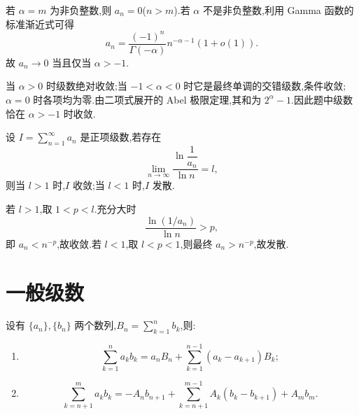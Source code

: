 \begin{solution}
    若 $\alpha=m$ 为非负整数,则 $a_n=0$($n>m$).若 $\alpha$ 不是非负整数,利用 Gamma 函数的标准渐近式可得
    \[
        a_n=\dfrac{(-1)^n}{\Gamma(-\alpha)}n^{-\alpha-1}(1+o(1)).
    \]
    故 $a_n\to0$ 当且仅当 $\alpha>-1$.

    当 $\alpha>0$ 时级数绝对收敛;当 $-1<\alpha<0$ 时它是最终单调的交错级数,条件收敛;$\alpha=0$ 时各项均为零.由二项式展开的 Abel 极限定理,其和为 $2^\alpha-1$.因此题中级数恰在 $\alpha>-1$ 时收敛.
\end{solution}

\begin{example}[对数判别法]
    设 $\displaystyle I=\sum\limits_{n=1}^{\infty}a_n$ 是正项级数,若存在
    \[
        \displaystyle\lim\limits_{n\to\infty}\dfrac{\ln\dfrac{1}{a_n}}{\ln n}=l,
    \]
    则当 $l>1$ 时,$I$ 收敛;当 $l<1$ 时,$I$ 发散.
\end{example}
\exampleblank

\begin{solution}
    若 $l>1$,取 $1<p<l$.充分大时
    \[
        \dfrac{\ln(1/a_n)}{\ln n}>p,
    \]
    即 $a_n<n^{-p}$,故收敛.若 $l<1$,取 $l<p<1$,则最终
    $a_n>n^{-p}$,故发散.
\end{solution}


\newpage

\section{一般级数}

\begin{proposition}
    设有 $\{a_n\},\{b_n\}$ 两个数列,$\displaystyle B_n=\sum\limits_{k=1}^nb_k$,则:
    \begin{enumerate}
        \item
              \[
                  \displaystyle\sum\limits_{k=1}^na_kb_k
                  =a_nB_n+\sum\limits_{k=1}^{n-1}(a_k-a_{k+1})B_k;
              \]
        \item
              \[
                  \displaystyle\sum\limits_{k=n+1}^ma_kb_k
                  =-A_nb_{n+1}+\sum\limits_{k=n+1}^{m-1}A_k(b_k-b_{k+1})+A_mb_m.
              \]
    \end{enumerate}
\end{proposition}

